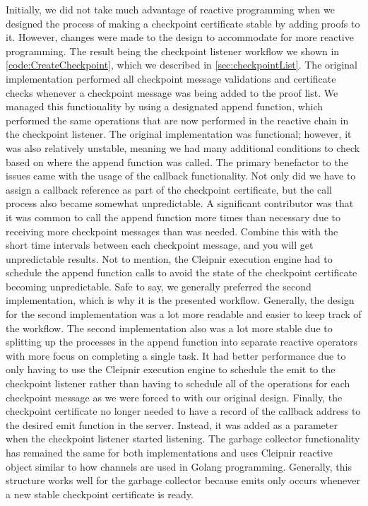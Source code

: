Initially, we did not take much advantage of reactive programming when we designed the process of making a checkpoint certificate stable by adding proofs to it. However, changes were made to the design to accommodate for more reactive programming. The result being the checkpoint listener workflow we shown in \autoref{code:CreateCheckpoint}, which we described in \autoref{sec:checkpointList}. The original implementation performed all checkpoint message validations and certificate checks whenever a checkpoint message was being added to the proof list. We managed this functionality by using a designated append function, which performed the same operations that are now performed in the reactive chain in the checkpoint listener. The original implementation was functional; however, it was also relatively unstable, meaning we had many additional conditions to check based on where the append function was called. The primary benefactor to the issues came with the usage of the callback functionality. Not only did we have to assign a callback reference as part of the checkpoint certificate, but the call process also became somewhat unpredictable. A significant contributor was that it was common to call the append function more times than necessary due to receiving more checkpoint messages than was needed. Combine this with the short time intervals between each checkpoint message, and you will get unpredictable results. Not to mention, the Cleipnir execution engine had to schedule the append function calls to avoid the state of the checkpoint certificate becoming unpredictable. Safe to say, we generally preferred the second implementation, which is why it is the presented workflow. Generally, the design for the second implementation was a lot more readable and easier to keep track of the workflow. The second implementation also was a lot more stable due to splitting up the processes in the append function into separate reactive operators with more focus on completing a single task. It had better performance due to only having to use the Cleipnir execution engine to schedule the emit to the checkpoint listener rather than having to schedule all of the operations for each checkpoint message as we were forced to with our original design. Finally, the checkpoint certificate no longer needed to have a record of the callback address to the desired emit function in the server. Instead, it was added as a parameter when the checkpoint listener started listening.
The garbage collector functionality has remained the same for both implementations and uses Cleipnir reactive  object similar to how channels are used in Golang programming. Generally, this structure works well for the garbage collector because emits only occurs whenever a  new stable checkpoint certificate is ready.

